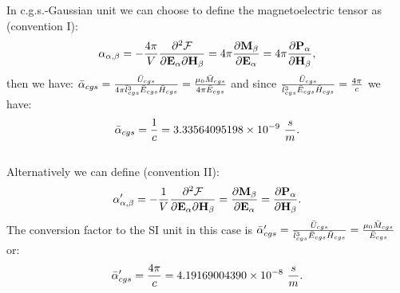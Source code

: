 \documentclass[12pt,a4paper]{article}
\def\alphatoalpha{3.33564095198\times 10^{-9}}
\def\alphaptoalphap{4.19169004390\times 10^{-8}}
\begin{document}
{\color{orange} 
In c.g.s.-Gaussian unit we can choose to define the magnetoelectric 
tensor as (convention I): 
\begin{equation}
\alpha_{\alpha,\beta}=-{4 \pi\over V} {\partial^2 \mathcal{F} \over \partial 
{\bf E}_{\alpha} \partial {\bf H}_{\beta}}= 4 \pi {\partial {\bf M}_{\beta} 
\over \partial {\bf E}_{\alpha}}= 4 \pi
{\partial {\bf P}_{\alpha} \over \partial {\bf H}_{\beta}},
\end{equation}
then we have: $\bar \alpha_{cgs}=
{\bar U_{cgs} \over 4 \pi \bar l_{cgs}^3 \bar E_{cgs} 
\bar H_{cgs}}={\mu_0 \bar M_{cgs} \over 4 \pi \bar E_{cgs}}$ 
and since ${\bar U_{cgs} \over \bar l_{cgs}^3 \bar E_{cgs} 
\bar H_{cgs}} ={4 \pi \over c}$ we have:
\begin{equation}
\bar \alpha_{cgs}={1 \over c} = \alphatoalpha\ {s \over m}.
\end{equation}
\\
Alternatively we can define (convention II):
\begin{equation}
\alpha'_{\alpha,\beta}=-{1\over V} {\partial^2 \mathcal{F} \over \partial 
{\bf E}_{\alpha} \partial {\bf H}_{\beta}}={\partial {\bf M}_{\beta} \over \partial 
{\bf E}_{\alpha}}={\partial {\bf P}_{\alpha} \over \partial 
{\bf H}_{\beta}}. 
\end{equation}
The conversion factor to the SI unit in this case is 
$\bar \alpha'_{cgs}={\bar U_{cgs} \over \bar l_{cgs}^3 \bar E_{cgs} 
\bar H_{cgs}}={\mu_0 \bar M_{cgs} \over \bar E_{cgs}}$ or:
\begin{equation}
\bar \alpha'_{cgs}={4 \pi \over c}=\alphaptoalphap\ {s\over m}.
\end{equation}
}

\newpage
\end{document}
